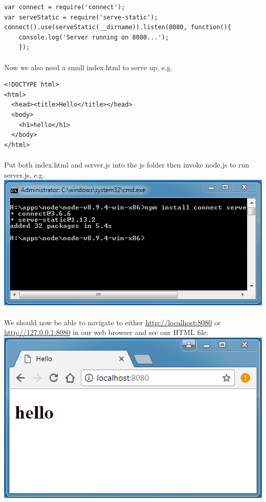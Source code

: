 \documentclass[10pt, a4paper, twosize]{article}
\begin{document}
\begin{lstlisting}
var connect = require('connect');
var serveStatic = require('serve-static');
connect().use(serveStatic(__dirname)).listen(8080, function(){ 
    console.log('Server running on 8080...');
    });
\end{lstlisting}

\paragraph{} Now we also need a small index.html to serve up, e.g.

\begin{lstlisting}
<!DOCTYPE html>
<html>
  <head><title>Hello</title></head>
  <body>
    <h1>hello</h1>
  </body>
</html>
\end{lstlisting}

\paragraph{} Put both index.html and server.js into the js folder then invoke node.js to run server.js, e.g.\\

\includegraphics[width=.8\textwidth]{images/node_serving}

\paragraph{} We should now be able to navigate to either \url{http://localhost:8080} or \url{http://127.0.0.1:8080} in our web browser and see our HTML file:\\

\includegraphics[width=.8\textwidth]{images/node_serving_hello}
\end{document}
